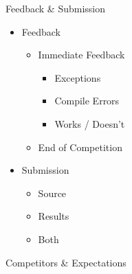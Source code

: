 \documentclass{beamer}
\begin{document}
\begin{frame}{Feedback \& Submission}
  \begin{centering}
    \begin{itemize}
      \item Feedback
      \begin{itemize}
        \item Immediate Feedback
        \begin{itemize}
          \item Exceptions
          \item Compile Errors
          \item Works / Doesn't
        \end{itemize}
        \item End of Competition
      \end{itemize}
      \pause
      \item Submission
      \begin{itemize}
        \item Source
        \item Results
        \item Both
      \end{itemize}
    \end{itemize}
  \end{centering}
\end{frame}


\begin{frame}{Competitors \& Expectations}

\end{frame}
\end{document}
